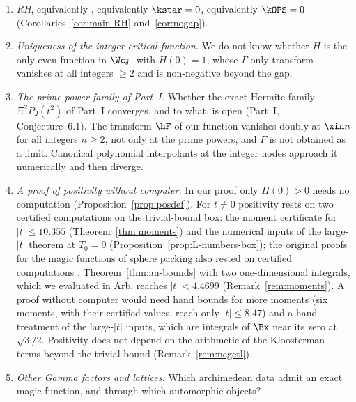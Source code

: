 \begin{enumerate}[label=(\arabic*),leftmargin=*]
\item \emph{RH}, equivalently \condE, equivalently $\kstar=0$, equivalently $\kOPS=0$ (Corollaries~\ref{cor:main-RH} and~\ref{cor:nogap}).
\item \emph{Uniqueness of the integer-critical function.} We do not know whether $H$ is the only even function in $\Wc_\delta$, with $H(0)=1$, whose
$\Gamma$-only transform vanishes at all integers $\ge2$ and is non-negative beyond the gap.
\item \emph{The prime-power family of Part~I.} Whether the exact Hermite family $\Xi^2P_J(t^2)$ of Part~I converges, and to what, is open
(Part~I, Conjecture~6.1). The transform $\hF$ of our function vanishes doubly at $\xin n$ for all integers $n\ge2$, not only at the prime powers, and $F$ is not obtained
as a limit.
Canonical polynomial interpolants at the integer nodes approach it numerically and then diverge.
\item \emph{A proof of positivity without computer.} In our proof only $H(0)>0$ needs no computation (Proposition~\ref{prop:posdef}). For
$t\ne0$ positivity rests on two certified computations on the trivial-bound box: the moment certificate for $|t|\le10.355$
(Theorem~\ref{thm:moments}) and the numerical inputs of the large-$|t|$ theorem at $T_0=9$ (Proposition~\ref{prop:L-numbers-box}); the original
proofs for the magic functions of sphere packing also rested on certified computations \cite{Via17,CKMRV17,CKMRV22}. Theorem~\ref{thm:an-bounds}
with two one-dimensional integrals, which we evaluated in Arb, reaches $|t|<4.4699$ (Remark~\ref{rem:moments}). A proof without computer would
need hand bounds for more moments (six moments, with their certified values, reach only $|t|\le8.47$) and a hand treatment of the large-$|t|$
inputs, which are integrals of $\Bx$ near its zero at $\sqrt3/2$. Positivity does not depend on the arithmetic of the Kloosterman terms beyond
the trivial bound (Remark~\ref{rem:negctl}).
\item \emph{Other Gamma factors and lattices.} Which archimedean data admit an exact magic function, and through which automorphic objects?
\end{enumerate}
